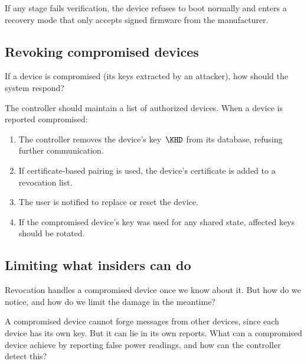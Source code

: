 If any stage fails verification, the device refuses to boot normally and
enters a recovery mode that only accepts signed firmware from the
manufacturer.

\subsection{Revoking compromised devices}

\begin{exercise}
  If a device is compromised (its keys extracted by an attacker), how
  should the system respond?
\end{exercise}

The controller should maintain a list of authorized devices.
When a device is reported compromised:
\begin{enumerate}
  \item The controller removes the device's key~\(\KHD\) from its
    database, refusing further communication.
  \item If certificate-based pairing is used, the device's certificate is
    added to a revocation list.
  \item The user is notified to replace or reset the device.
  \item If the compromised device's key was used for any shared state,
    affected keys should be rotated.
\end{enumerate}

\subsection{Limiting what insiders can do}\label{EnergyInsiders}


Revocation handles a compromised device once we know about it.
But how do we notice, and how do we limit the damage in the meantime?

\begin{exercise}
  A compromised device cannot forge messages from other devices, since each
  device has its own key.
  But it can lie in its own reports.
  What can a compromised device achieve by reporting false power readings,
  and how can the controller detect this?
\end{exercise}

